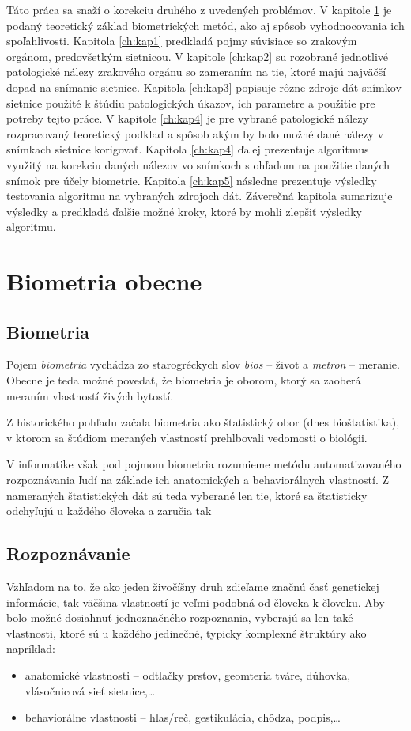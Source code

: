 Táto práca sa snaží o korekciu druhého z uvedených problémov. V kapitole \ref{ch:kap0} je podaný teoretický základ biometrických metód, ako aj spôsob vyhodnocovania ich spoľahlivosti. Kapitola \ref{ch:kap1} predkladá pojmy súvisiace so zrakovým orgánom, predovšetkým sietnicou. V kapitole \ref{ch:kap2} su rozobrané jednotlivé patologické nálezy zrakového orgánu so zameraním na tie, ktoré majú najväčší dopad na snímanie sietnice. Kapitola \ref{ch:kap3} popisuje rôzne zdroje dát snímkov sietnice použité k štúdiu patologických úkazov, ich parametre a použitie pre potreby tejto práce. V kapitole \ref{ch:kap4} je pre vybrané patologické nálezy rozpracovaný teoretický podklad a spôsob akým by bolo možné dané nálezy v snímkach sietnice korigovať. Kapitola \ref{ch:kap4} ďalej prezentuje algoritmus využitý na korekciu daných nálezov vo snímkoch s ohľadom na použitie daných snímok pre účely biometrie. Kapitola \ref{ch:kap5} následne prezentuje výsledky testovania algoritmu na vybraných zdrojoch dát. Záverečná kapitola sumarizuje výsledky a predkladá ďalšie možné kroky, ktoré by mohli zlepšiť výsledky algoritmu.

\chapter{Biometria obecne}\label{ch:kap0}
\section{Biometria}
Pojem \emph{biometria} vychádza zo starogréckych slov \emph{bios} -- život a \emph{metron} -- meranie. Obecne je teda možné povedať, že biometria je oborom, ktorý sa zaoberá meraním vlastností živých bytostí.

Z historického pohľadu začala biometria ako štatistický obor (dnes bioštatistika), v ktorom sa štúdiom meraných vlastností prehlbovali vedomosti o biológii.

V informatike však pod pojmom biometria rozumieme metódu automatizovaného rozpoznávania ľudí na základe ich anatomických a behaviorálnych vlastností\cite{bio}.
Z nameraných štatistických dát sú teda vyberané len tie, ktoré sa štatisticky odchyľujú u každého človeka a zaručia tak

\section{Rozpoznávanie}
Vzhľadom na to, že ako jeden živočíšny druh zdieľame značnú časť genetickej informácie, tak väčšina vlastností je veľmi podobná od človeka k človeku. Aby bolo možné dosiahnuť jednoznačného rozpoznania, vyberajú sa len také vlastnosti, ktoré sú u každého jedinečné, typicky komplexné štruktúry ako napríklad:
\begin{itemize}
\item anatomické vlastnosti -- odtlačky prstov, geomteria tváre, dúhovka, vlásočnicová sieť sietnice,\dots
\item behaviorálne vlastnosti -- hlas/reč, gestikulácia, chôdza, podpis,\dots
\end{itemize}

